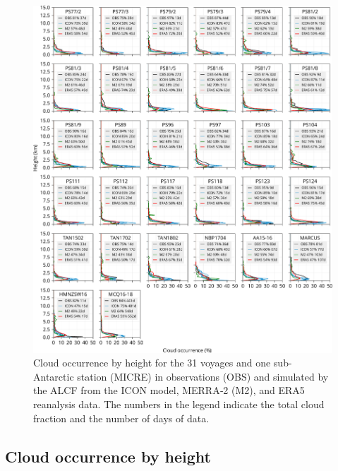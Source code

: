 \documentclass[12pt,a4paper]{article}
\begin{document}
\begin{figure}[p!]
\centerline{
\includegraphics[width=1.06\textwidth]{img/cloud_occurrence_panel.pdf}
}
\caption{Cloud occurrence by height for the 31 voyages and one sub-Antarctic
station (MICRE) in observations (OBS) and simulated by the ALCF from the
ICON model, MERRA‐2 (M2), and ERA5 reanalysis data. The numbers in the legend
indicate the total cloud fraction and the number of days of data.}
\label{fig:cloud-occurrence-panel}
\end{figure}

\subsection{Cloud occurrence by height}
\label{sec:cloud-occurrence}
\end{document}
